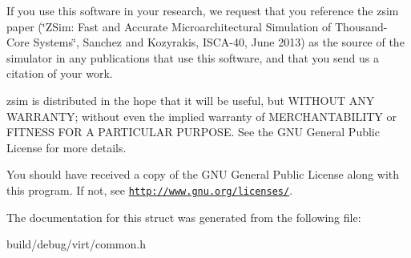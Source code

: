 If you use this software in your research, we request that you reference the zsim paper (\char`\"{}\-Z\-Sim\-: Fast and Accurate Microarchitectural Simulation of
\-Thousand-\/\-Core Systems\char`\"{}, Sanchez and Kozyrakis, I\-S\-C\-A-\/40, June 2013) as the source of the simulator in any publications that use this software, and that you send us a citation of your work.

zsim is distributed in the hope that it will be useful, but W\-I\-T\-H\-O\-U\-T A\-N\-Y W\-A\-R\-R\-A\-N\-T\-Y; without even the implied warranty of M\-E\-R\-C\-H\-A\-N\-T\-A\-B\-I\-L\-I\-T\-Y or F\-I\-T\-N\-E\-S\-S F\-O\-R A P\-A\-R\-T\-I\-C\-U\-L\-A\-R P\-U\-R\-P\-O\-S\-E. See the G\-N\-U General Public License for more details.

You should have received a copy of the G\-N\-U General Public License along with this program. If not, see \href{http://www.gnu.org/licenses/}{\tt http\-://www.\-gnu.\-org/licenses/}. 

The documentation for this struct was generated from the following file\-:\begin{DoxyCompactItemize}
\item 
build/debug/virt/common.\-h\end{DoxyCompactItemize}
